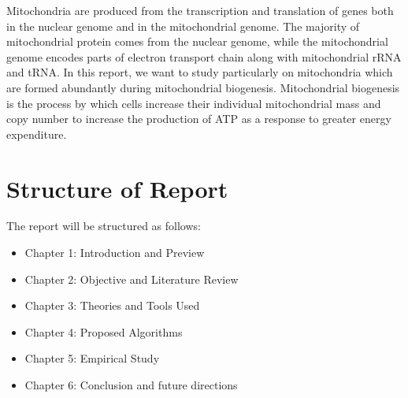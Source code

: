 Mitochondria are produced from the transcription and translation of genes both in the nuclear genome and in the mitochondrial genome. The majority of mitochondrial protein comes from the nuclear genome, while the mitochondrial genome encodes parts of electron transport chain along with mitochondrial rRNA and tRNA. In this report, we want to study particularly on mitochondria which are formed abundantly during mitochondrial biogenesis. Mitochondrial biogenesis is the process by which cells increase their individual mitochondrial mass and copy number to increase the production of ATP as a response to greater energy expenditure. 

\section{Structure of Report}
The report will be structured as follows:
\begin{itemize}
\item Chapter 1: Introduction and Preview
\item Chapter 2: Objective and Literature Review
\item Chapter 3: Theories and Tools Used
\item Chapter 4: Proposed Algorithms
\item Chapter 5: Empirical Study
\item Chapter 6: Conclusion and future directions
\end{itemize}